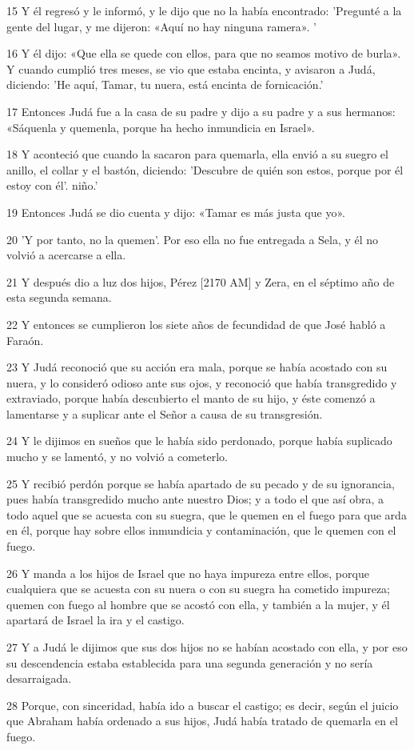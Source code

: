 \par 15 Y él regresó y le informó, y le dijo que no la había encontrado: 'Pregunté a la gente del lugar, y me dijeron: «Aquí no hay ninguna ramera». '
\par 16 Y él dijo: «Que ella se quede con ellos, para que no seamos motivo de burla». Y cuando cumplió tres meses, se vio que estaba encinta, y avisaron a Judá, diciendo: 'He aquí, Tamar, tu nuera, está encinta de fornicación.'
\par 17 Entonces Judá fue a la casa de su padre y dijo a su padre y a sus hermanos: «Sáquenla y quemenla, porque ha hecho inmundicia en Israel».
\par 18 Y aconteció que cuando la sacaron para quemarla, ella envió a su suegro el anillo, el collar y el bastón, diciendo: 'Descubre de quién son estos, porque por él estoy con él'. niño.'
\par 19 Entonces Judá se dio cuenta y dijo: «Tamar es más justa que yo».
\par 20 'Y por tanto, no la quemen'. Por eso ella no fue entregada a Sela, y él no volvió a acercarse a ella.
\par 21 Y después dio a luz dos hijos, Pérez [2170 AM] y Zera, en el séptimo año de esta segunda semana.
\par 22 Y entonces se cumplieron los siete años de fecundidad de que José habló a Faraón.
\par 23 Y Judá reconoció que su acción era mala, porque se había acostado con su nuera, y lo consideró odioso ante sus ojos, y reconoció que había transgredido y extraviado, porque había descubierto el manto de su hijo, y éste comenzó a lamentarse y a suplicar ante el Señor a causa de su transgresión.
\par 24 Y le dijimos en sueños que le había sido perdonado, porque había suplicado mucho y se lamentó, y no volvió a cometerlo.
\par 25 Y recibió perdón porque se había apartado de su pecado y de su ignorancia, pues había transgredido mucho ante nuestro Dios; y a todo el que así obra, a todo aquel que se acuesta con su suegra, que le quemen en el fuego para que arda en él, porque hay sobre ellos inmundicia y contaminación, que le quemen con el fuego.
\par 26 Y manda a los hijos de Israel que no haya impureza entre ellos, porque cualquiera que se acuesta con su nuera o con su suegra ha cometido impureza; quemen con fuego al hombre que se acostó con ella, y también a la mujer, y él apartará de Israel la ira y el castigo.
\par 27 Y a Judá le dijimos que sus dos hijos no se habían acostado con ella, y por eso su descendencia estaba establecida para una segunda generación y no sería desarraigada.
\par 28 Porque, con sinceridad, había ido a buscar el castigo; es decir, según el juicio que Abraham había ordenado a sus hijos, Judá había tratado de quemarla en el fuego.

